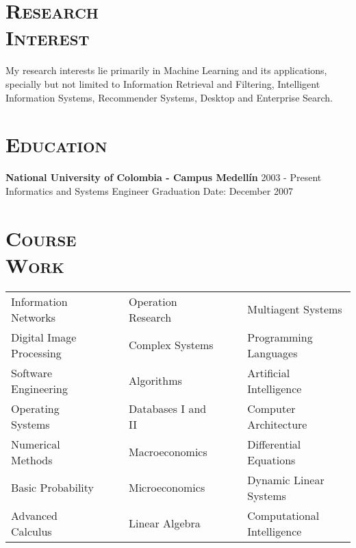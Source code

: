 \begin{resume}


\section{\textsc{Research\\ Interest}}
My research interests lie primarily in Machine Learning and its applications, specially but  not limited to Information Retrieval and Filtering, Intelligent Information Systems, Recommender Systems, Desktop and Enterprise Search.
\newline

\section{\textsc{Education}}
\textbf{National University of Colombia - Campus Medell\'{i}n} \hfill 2003 - Present \\
{\large Informatics and Systems Engineer} \hfill Graduation Date: December 2007\\

\section{\textsc{Course\\ Work}}
  \begin{tabular}{lllll}
Information Networks   & \ \ &  Operation Research   & \ \ &
Multiagent Systems  \\ 
Digital Image Processing     & \ \ & Complex Systems  & \ \ & Programming Languages \\
Software Engineering   & \ \ & Algorithms          & \ \ & Artificial Intelligence     \\
Operating Systems      & \ \ & Databases I and II          & \ \ & Computer Architecture \\
Numerical Methods      & \ \ & Macroeconomics       & \ \ & Differential Equations      \\
Basic Probability      & \ \ & Microeconomics      & \ \ & Dynamic Linear Systems      \\
Advanced Calculus      & \ \ & Linear Algebra    & \ \ & Computational Intelligence   \\
\end{tabular}
\newline




\end{resume}
